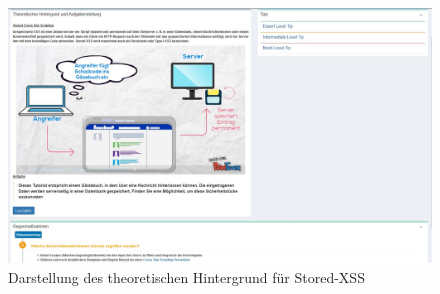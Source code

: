 \begin{figure}[H]
	\centering
	\includegraphics[width=\textwidth]{images/XSS/stored-xss-theorie.jpg}
	\caption{Darstellung des theoretischen Hintergrund für Stored-XSS}
	\label{fig:stored-xss-theorie}
\end{figure}

